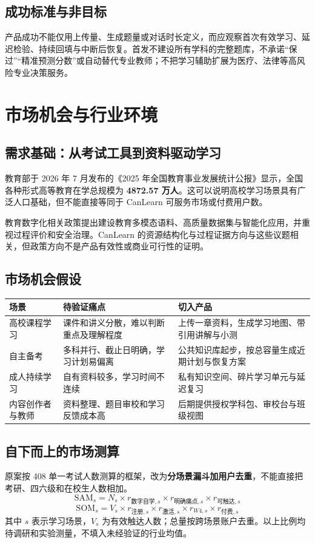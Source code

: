 \documentclass[UTF8,a4paper,11pt,fontset=none]{ctexart}
\newcommand{\cth}[1]{\textbf{\sffamily #1}}
\newcommand{\newsec}[1]{\clearpage\section{#1}}
\newenvironment{tbl}{\par\vspace{3pt}\small\noindent\ignorespaces}{\unskip\par\vspace{5pt}}
\begin{document}
\subsection{成功标准与非目标}
产品成功不能仅用上传量、生成题量或对话时长定义，而应观察首次有效学习、延迟检验、持续回填与中断后恢复。首发不建设所有学科的完整题库，不承诺“保过”“精准预测分数”或自动替代专业教师；不把学习辅助扩展为医疗、法律等高风险专业决策服务。

\newsec{市场机会与行业环境}
\subsection{需求基础：从考试工具到资料驱动学习}
教育部于 2026 年 7 月发布的《2025 年全国教育事业发展统计公报》显示，全国各种形式高等教育在学总规模为 \textbf{4872.57 万人}。这可以说明高校学习场景具有广泛人口基础，但不能直接等同于 CanLearn 可服务市场或付费用户数。\cite{moe2025}

教育数字化相关政策提出建设教育多模态语料、高质量数据集与智能化应用，并重视过程评价和安全治理。CanLearn 的资源结构化与过程证据方向与这些议题相关，但政策方向不是产品有效性或商业可行性的证明。\cite{digital}

\subsection{市场机会假设}
\begin{tbl}
\begin{tabularx}{\linewidth}{@{}L{28mm}YY@{}}
\toprule
\cth{场景}&\cth{待验证痛点}&\cth{切入产品}\\\midrule
高校课程学习&课件和讲义分散，难以判断重点及理解程度&上传一章资料，生成学习地图、带引用讲解与小测\\
自主备考&多科并行、截止日明确，学习计划易偏离&公共知识库起步，按总容量生成近期计划与恢复方案\\
成人持续学习&自有资料较多，学习时间不连续&私有知识空间、碎片学习单元与延迟复习\\
内容创作者与教师&资料整理、题目审校和学习反馈成本高&后期提供授权学科包、审校台与班级视图\\
\bottomrule
\end{tabularx}
\end{tbl}

\subsection{自下而上的市场测算}
原案按 408 单一考试人数测算的框架，改为\textbf{分场景漏斗加用户去重}，不能直接把考研、四六级和在校生人数相加。\cite{original}
\[
\mathrm{SAM}_{s}=N_s\times r_{\text{数字自学},s}\times r_{\text{明确痛点},s}\times r_{\text{可触达},s}
\]
\[
\mathrm{SOM}_{s}=V_s\times r_{\text{注册},s}\times r_{\text{激活},s}\times r_{W4,s}\times r_{\text{付费},s}
\]
其中 $s$ 表示学习场景，$V_s$ 为有效触达人数；总量按跨场景账户去重。以上比例均待调研和实验测量，不填入未经验证的行业均值。
\end{document}
